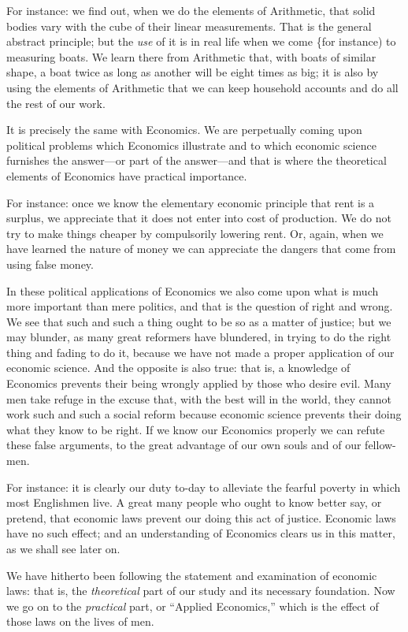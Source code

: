 \documentclass{book}
\begin{document}
For instance: we find out, when we do the elements of Arithmetic, that solid bodies vary with the cube of their linear measurements. That is the general abstract principle; but the \emph{use} of it is in real life when we come \{for instance) to measuring boats. We learn there from Arithmetic that, with boats of similar shape, a boat twice as long as another will be eight times as big; it is also by using the elements of Arithmetic that we can keep household accounts and do all the rest of our work.

It is precisely the same with Economics. We are perpetually coming upon political problems which Economics illustrate and to which economic science furnishes the answer—or part of the answer—and that is where the theoretical elements of Economics have practical importance.

For instance: once we know the elementary economic principle that rent is a surplus, we appreciate that it does not enter into cost of production. We do not try to make things cheaper by compulsorily lowering rent. Or, again, when we have learned the nature of money we can appreciate the dangers that come from using false money.

In these political applications of Economics we also come upon what is much more important than mere politics, and that is the question of right and wrong. We see that such and such a thing ought to be so as a matter of justice; but we may blunder, as many great reformers have blundered, in trying to do the right thing and fading to do it, because we have not made a proper application of our economic science. And the opposite is also true: that is, a knowledge of Economics prevents their being wrongly applied by those who desire evil. Many men take refuge in the excuse that, with the best will in the world, they cannot work such and such a social reform because economic science prevents their doing what they know to be right. If we know our Economics properly we can refute these false arguments, to the great advantage of our own souls and of our fellow-men.

For instance: it is clearly our duty to-day to alleviate the fearful poverty in which most Englishmen live. A great many people who ought to know better say, or pretend, that economic laws prevent our doing this act of justice. Economic laws have no such effect; and an understanding of Economics clears us in this matter, as we shall see later on.

We have hitherto been following the statement and examination of economic laws: that is, the \emph{theoretical} part of our study and its necessary foundation. Now we go on to the \emph{practical} part, or “Applied Economics,” which is the effect of those laws on the lives of men.
\end{document}
